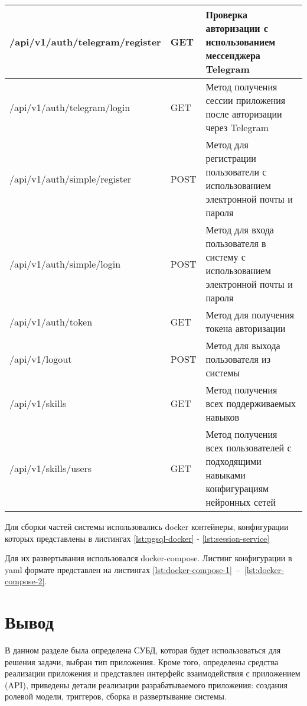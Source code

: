 \begin{landscape}
\begin{longtable}{|p{}|p{}|p{}|}
    
    /api/v1/auth/telegram/register          & GET & Проверка авторизации с использованием мессенджера Telegram \\\hline
    /api/v1/auth/telegram/login  & GET & Метод получения сессии приложения после авторизации через Telegram \\\hline
     /api/v1/auth/simple/register  & POST & Метод для регистрации пользователи с использованием электронной почты и пароля \\\hline
    /api/v1/auth/simple/login  & POST & Метод для входа пользователя в систему с использованием электронной почты и пароля \\\hline
     /api/v1/auth/token  & GET & Метод для получения токена авторизации\\\hline
    /api/v1/logout         & POST & Метод для выхода пользователя из системы \\\hline
    
    /api/v1/skills           & GET & Метод получения всех поддерживаемых навыков \\\hline
    /api/v1/skills/users          & GET & Метод получения всех пользователей с подходящими навыками конфигурациям нейронных сетей\\\hline
\end{longtable}
\end{landscape}

Для сборки частей системы использовались docker контейнеры, конфигурации которых представлены в листингах \ref{lst:pgsql-docker} - \ref{lst:session-service}

Для их развертывания использовался docker-compose. Листинг конфигурации в yaml формате представлен на листингах \ref{lst:docker-compose-1}~--~\ref{lst:docker-compose-2}.

\section*{Вывод}
В данном разделе была определена СУБД, которая будет использоваться для решения задачи, выбран тип приложения. Кроме того, определены средства реализации приложения и представлен интерфейс взаимодействия с приложением (API), приведены детали реализации разрабатываемого приложения: создания ролевой модели, триггеров, сборка и развертывание системы.  

